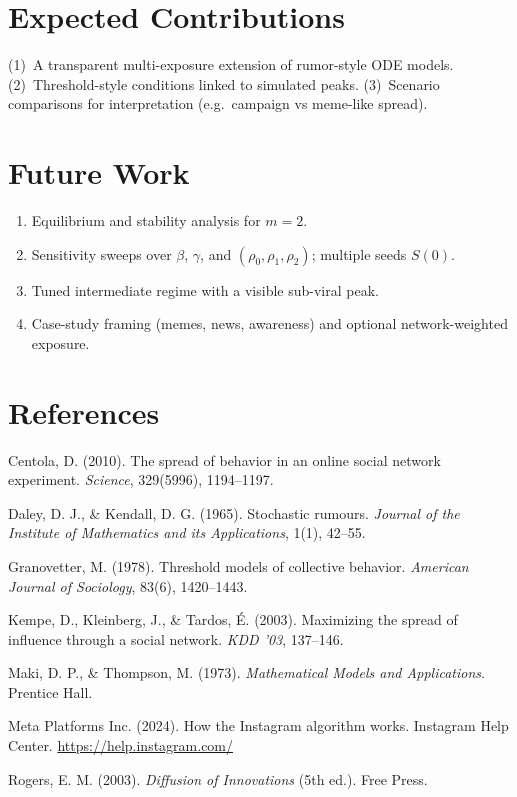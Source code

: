 \documentclass[11pt]{article}
\begin{document}
\section{Expected Contributions}

(1)~A transparent multi-exposure extension of rumor-style ODE models. (2)~Threshold-style conditions linked to simulated peaks. (3)~Scenario comparisons for interpretation (e.g.\ campaign vs meme-like spread).

\section{Future Work}

\begin{enumerate}
    \item Equilibrium and stability analysis for $m=2$.
    \item Sensitivity sweeps over $\beta$, $\gamma$, and $(\rho_0,\rho_1,\rho_2)$; multiple seeds $S(0)$.
    \item Tuned intermediate regime with a visible sub-viral peak.
    \item Case-study framing (memes, news, awareness) and optional network-weighted exposure.
\end{enumerate}

\section{References}

Centola, D. (2010). The spread of behavior in an online social network experiment. \textit{Science}, 329(5996), 1194--1197.

Daley, D. J., \& Kendall, D. G. (1965). Stochastic rumours. \textit{Journal of the Institute of Mathematics and its Applications}, 1(1), 42--55.

Granovetter, M. (1978). Threshold models of collective behavior. \textit{American Journal of Sociology}, 83(6), 1420--1443.

Kempe, D., Kleinberg, J., \& Tardos, \'E. (2003). Maximizing the spread of influence through a social network. \textit{KDD '03}, 137--146.

Maki, D. P., \& Thompson, M. (1973). \textit{Mathematical Models and Applications}. Prentice Hall.

Meta Platforms Inc. (2024). How the Instagram algorithm works. Instagram Help Center. \url{https://help.instagram.com/}

Rogers, E. M. (2003). \textit{Diffusion of Innovations} (5th ed.). Free Press.
\end{document}
